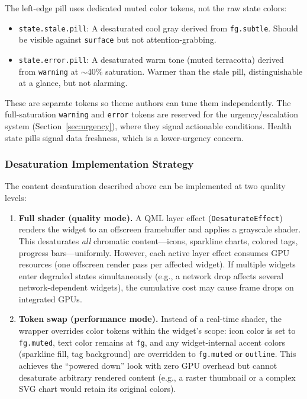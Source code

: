 \documentclass[11pt,a4paper]{article}
\begin{document}
\begin{designbox}
The left-edge pill uses dedicated muted color tokens, not the raw state colors:
\begin{itemize}[leftmargin=1.5em, itemsep=2pt]
  \item \texttt{state.stale.pill}: A desaturated cool gray derived from \texttt{fg.subtle}. Should be visible against \texttt{surface} but not attention-grabbing.
  \item \texttt{state.error.pill}: A desaturated warm tone (muted terracotta) derived from \texttt{warning} at $\sim$40\% saturation. Warmer than the stale pill, distinguishable at a glance, but not alarming.
\end{itemize}
These are separate tokens so theme authors can tune them independently. The full-saturation \texttt{warning} and \texttt{error} tokens are reserved for the urgency/escalation system (Section~\ref{sec:urgency}), where they signal actionable conditions. Health state pills signal data freshness, which is a lower-urgency concern.
\end{designbox}

\subsubsection{Desaturation Implementation Strategy}

The content desaturation described above can be implemented at two quality levels:

\begin{enumerate}[leftmargin=1.5em, itemsep=3pt]
  \item \textbf{Full shader (quality mode).} A QML layer effect (\texttt{DesaturateEffect}) renders the widget to an offscreen framebuffer and applies a grayscale shader. This desaturates \emph{all} chromatic content---icons, sparkline charts, colored tags, progress bars---uniformly. However, each active layer effect consumes GPU resources (one offscreen render pass per affected widget). If multiple widgets enter degraded states simultaneously (e.g., a network drop affects several network-dependent widgets), the cumulative cost may cause frame drops on integrated GPUs.

  \item \textbf{Token swap (performance mode).} Instead of a real-time shader, the wrapper overrides color tokens within the widget's scope: icon color is set to \texttt{fg.muted}, text color remains at \texttt{fg}, and any widget-internal accent colors (sparkline fill, tag background) are overridden to \texttt{fg.muted} or \texttt{outline}. This achieves the ``powered down'' look with zero GPU overhead but cannot desaturate arbitrary rendered content (e.g., a raster thumbnail or a complex SVG chart would retain its original colors).
\end{enumerate}
\end{document}
